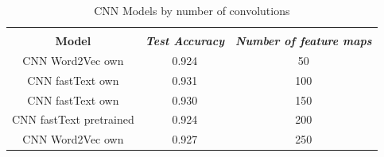 \documentclass[conference]{IEEEtran}
\begin{document}
\begin{table}[htbp]
\caption{CNN Models by number of convolutions}
\begin{center}
\begin{tabular}{|c|c|c|}
\hline
\textbf{}&\multicolumn{2}{|c|}{\textbf{}} \\ 
\cline{2-3}
\textbf{Model} & \textbf{\textit{Test Accuracy}}& \textbf{\textit{Number of feature maps}} \\ 
\hline
CNN Word2Vec own & 0.924 & 50 \\ 
\hline
CNN fastText own & 0.931 & 100 \\ 
\hline
CNN fastText own & 0.930& 150 \\ 
\hline
CNN fastText pretrained & 0.924 & 200 \\ 
\hline
CNN Word2Vec own & 0.927 & 250 \\ 
\hline
\end{tabular}
\label{tabfmaps}
\end{center}
\end{table}
\end{document}
